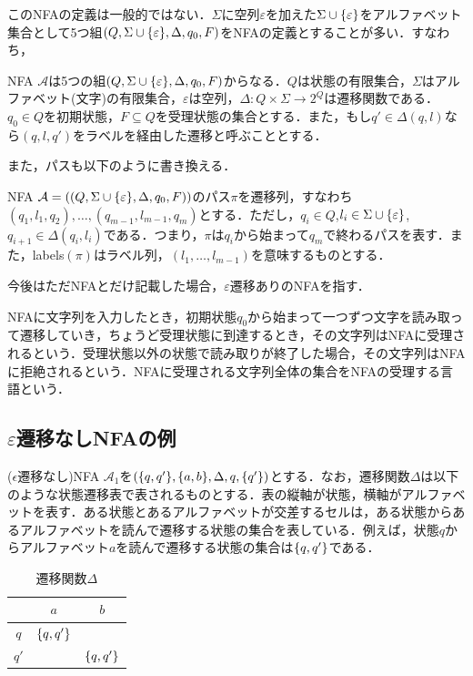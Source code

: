 \documentclass[a4paper, 12pt, dvipdfmx, uplatex]{jsreport}
\begin{document}
このNFAの定義は一般的ではない．$\Sigma$に空列$\varepsilon$を加えた$\Sigma \cup \qty{\varepsilon}$をアルファベット集合として5つ組$(Q,\Sigma \cup \qty{\varepsilon},\Delta,q_0,F)$をNFAの定義とすることが多い．すなわち，

\begin{dfn}[NFA]
  NFA $\mathcal{A}$は5つの組$(Q,\Sigma \cup \qty{\varepsilon},\Delta,q_0,F)$からなる．$Q$は状態の有限集合，$\Sigma$はアルファベット(文字)の有限集合，$\varepsilon$は空列，$\Delta :Q\times \Sigma \rightarrow 2^Q$は遷移関数である．$q_0 \in Q$を初期状態，$F \subseteq Q$を受理状態の集合とする．また，もし$q'\in \Delta (q,l)$なら$(q,l,q')$をラベルを経由した遷移と呼ぶこととする．
\end{dfn}

また，パスも以下のように書き換える．
\begin{dfn}[パス]
  NFA $\mathcal{A}=((Q,\Sigma \cup \qty{\varepsilon},\Delta,q_0,F))$のパス$\pi$を遷移列，すなわち$(q_1,l_1,q_2),\ldots,(q_{m-1},l_{m-1},q_{m})$とする．ただし，$q_i \in Q$,$l_i \in \Sigma \cup \qty{\varepsilon}$,$q_{i+1} \in \Delta(q_i,l_i)$である．つまり，$\pi$は$q_i$から始まって$q_m$で終わるパスを表す．また，labels$(\pi)$はラベル列，$(l_1,\ldots ,l_{m-1})$を意味するものとする．
\end{dfn}


今後はただNFAとだけ記載した場合，$\varepsilon$遷移ありのNFAを指す．

NFAに文字列を入力したとき，初期状態$q_0$から始まって一つずつ文字を読み取って遷移していき，ちょうど受理状態に到達するとき，その文字列はNFAに受理されるという．受理状態以外の状態で読み取りが終了した場合，その文字列はNFAに拒絶されるという．NFAに受理される文字列全体の集合をNFAの受理する言語という．



\subsection{$\varepsilon$遷移なしNFAの例}
($\epsilon$遷移なし)NFA $\mathcal{A}_1$を$(\qty{q,q'},\qty{a,b},\Delta,q,\qty{q'})$とする．なお，遷移関数$\Delta$は以下のような状態遷移表で表されるものとする．表の縦軸が状態，横軸がアルファベットを表す．ある状態とあるアルファベットが交差するセルは，ある状態からあるアルファベットを読んで遷移する状態の集合を表している．例えば，状態$q$からアルファベット$a$を読んで遷移する状態の集合は$\qty{q,q'}$である．

\begin{table}[H]
  \centering
  \caption{遷移関数$\Delta$\label{delta}}
  \begin{tabular}{c|c|c} \hline \hline
       & $a$  &$b$ \\\hline
    $q$  & $\qty{q,q'}$ &$\qty{}$ \\\hline
    $q'$ & $\qty{}$  &$\qty{q,q'}$ \\\hline
  \end{tabular}
\end{table}
\end{document}
